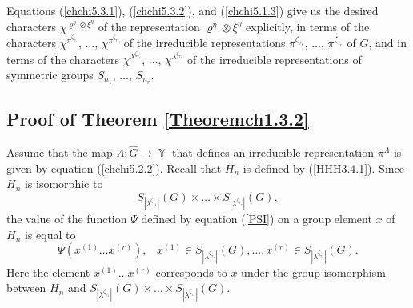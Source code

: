 \documentclass[12pt]{amsart}
\theoremstyle{definition}
\numberwithin{equation}{section}
\DeclareMathOperator{\Y}{\mathbb{Y}}
\begin{document}
Equations (\ref{chchi5.3.1}), (\ref{chchi5.3.2}), and (\ref{chchi5.1.3}) give us the desired characters $\chi^{\varrho^{\eta}\otimes\xi^{\eta}}$
of the representation $\varrho^{\eta}\otimes\xi^{\eta}$ explicitly,
in terms of the characters $\chi^{\pi^{\zeta_{\tau_1}}}$, $\ldots$, $\chi^{\pi^{\zeta_{\tau_r}}}$ of the irreducible representations $\pi^{\zeta_{\tau_1}}$, $\ldots$, $\pi^{\zeta_{\tau_r}}$ of $G$, and in terms of  the characters $\chi^{\lambda^{\zeta_{\tau_1}}}$, $\ldots$, $\chi^{\lambda^{\zeta_{\tau_r}}}$ of the irreducible representations of symmetric groups $S_{n_1}$, $\ldots$, $S_{n_r}$.
\subsection{Proof of Theorem \ref{Theoremch1.3.2}}
Assume that the map $\Lambda: \widehat{G}\longrightarrow\Y$ that defines an irreducible representation $\pi^{\Lambda}$ is given by equation (\ref{chchi5.2.2}).
Recall that $H_n$ is defined by (\ref{HHH3.4.1}). Since $H_n$ is isomorphic to
$$
S_{|\lambda^{\zeta_{\tau_1}}|}(G)\times\ldots\times S_{|\lambda^{\zeta_{\tau_\tau}}|}(G),
$$
the value of the function $\Psi$  defined by equation (\ref{PSI}) on a group element $x$ of $H_n$ is equal to
$$
\Psi(x^{(1)}\ldots x^{(r)}),\;\;\; x^{(1)}\in S_{|\lambda^{\zeta_{\tau_1}}|}(G),
\ldots, x^{(r)}\in S_{|\lambda^{\zeta_{\tau_\tau}}|}(G).
$$
Here the element $x^{(1)}\ldots x^{(r)}$ corresponds to $x$ under the group isomorphism between
$H_n$ and $S_{|\lambda^{\zeta_{\tau_1}}|}(G)\times\ldots\times S_{|\lambda^{\zeta_{\tau_\tau}}|}(G)$.
\end{document}
